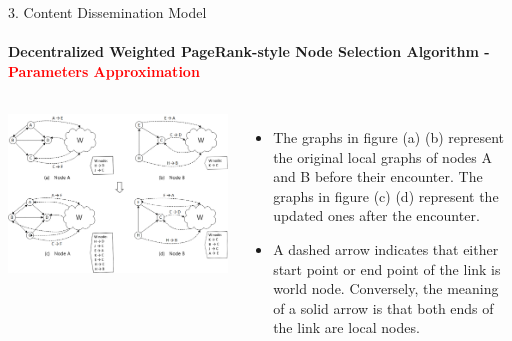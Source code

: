 \documentclass{beamer}		%
\begin{document}
\begin{frame}{3. Content Dissemination Model}
\framesubtitle{Decentralized Weighted PageRank-style Node Selection Algorithm - \textcolor{red}{Parameters Approximation}}
\begin{columns}
\includegraphics[scale=0.048]{Fig3.png}
\begin{itemize}
    \item The graphs in figure (a) (b) represent the original local graphs of nodes A and B before their encounter. The graphs in figure (c) (d) represent the updated ones after the encounter. 
    \item A dashed arrow indicates that either start point or end point of the link is world node. Conversely, the meaning of a solid arrow is that both ends of the link are local nodes.
\end{itemize}
\end{columns}
\end{frame}
\end{document}
